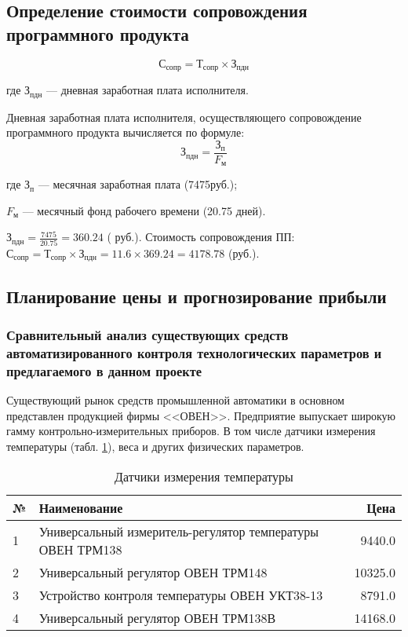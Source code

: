 \subsection{Определение стоимости сопровождения программного продукта}
\begin{equation}
	\textrm{С}_\textrm{сопр} = \textrm{Т}_\textrm{сопр} \times{} \textrm{З}_\textrm{пдн}
\end{equation}
\begin{ESKDexplanation}
	\item[где ]{} $\textrm{З}_\textrm{пдн}$ --- дневная заработная плата исполнителя.
\end{ESKDexplanation}
Дневная заработная плата исполнителя, осуществляющего сопровождение программного продукта вычисляется по формуле:
\begin{equation}
	\textrm{З}_\textrm{пдн} = \frac{\textrm{З}_\textrm{п}}{F_\textrm{м}}
\end{equation}
\begin{ESKDexplanation}
	\item[где ]{} $\textrm{З}_\textrm{п}$ --- месячная заработная плата (7475руб.);
	\item{} $F_\textrm{м}$ --- месячный фонд рабочего времени (20.75 дней).
\end{ESKDexplanation}
$\textrm{З}_\textrm{пдн} = \frac{7475}{20.75} = 360.24$ ( руб.).
Стоимость сопровождения ПП: $\textrm{С}_\textrm{сопр} = \textrm{Т}_\textrm{сопр} \times{} \textrm{З}_\textrm{пдн} = 11.6 \times{} 369.24 = 4178.78$ (руб.).


\subsection{Планирование цены и прогнозирование прибыли}
\subsubsection{Сравнительный анализ существующих средств автоматизированного контроля технологических параметров и предлагаемого в данном проекте}
Существующий рынок средств промышленной автоматики в основном представлен  продукцией фирмы <<ОВЕН>>.
Предприятие выпускает широкую гамму контрольно-измерительных приборов.
В том числе датчики измерения температуры (табл. \ref{table:temperatureSensors}), веса и других физических параметров.

\begin{table}
\caption{Датчики измерения температуры}
\begin{tabular}{|l|p{14cm}|r|}
\hline{}
№ & Наименование & Цена \\
\hline{}
1 & Универсальный измеритель-регулятор температуры ОВЕН ТРМ138 & 9440.0 \\
\hline{}
2 & Универсальный регулятор ОВЕН ТРМ148 & 10325.0 \\
\hline{}
3 & Устройство контроля температуры ОВЕН УКТ38-13 & 8791.0 \\
\hline{}
4 & Универсальный регулятор ОВЕН ТРМ138В & 14168.0 \\
\hline
\end{tabular}
\label{table:temperatureSensors}
\end{table}

